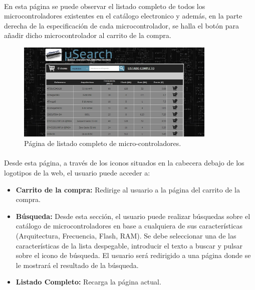 \paragraph{}En esta página se puede observar el listado completo de todos los microcontroladores existentes en el catálogo electronico y además, en la parte derecha de la especificación de cada microcontrolador, se halla el botón para añadir dicho microcontrolador al carrito de la compra.

\begin{figure}[h!]
	\centering
	\includegraphics[width=0.85\textwidth]{img/listado_completo_user}
	\caption{Página de listado completo de micro-controladores.}
	\label{fig:listado_completo_user}
\end{figure}

\paragraph{}Desde esta página, a través de los iconos situados en la cabecera debajo de los logotipos de la web, el usuario puede acceder a:

\begin{itemize}
	\item\textbf{Carrito de la compra:} Redirige al usuario a la página del carrito de la compra.
		
	\item \textbf{Búsqueda:} Desde esta sección, el usuario puede realizar búsquedas sobre el catálogo de microcontroladores en base a cualquiera de sus características (Arquitectura, Frecuencia, Flash, RAM). Se debe seleccionar una de las características de la lista despegable, introducir el texto a buscar y pulsar sobre el icono de búsqueda.
	El usuario será redirigido a una página donde se le mostrará el resultado de la búsqueda.
		
	\item \textbf{Listado Completo:} Recarga la página actual.
\end{itemize}